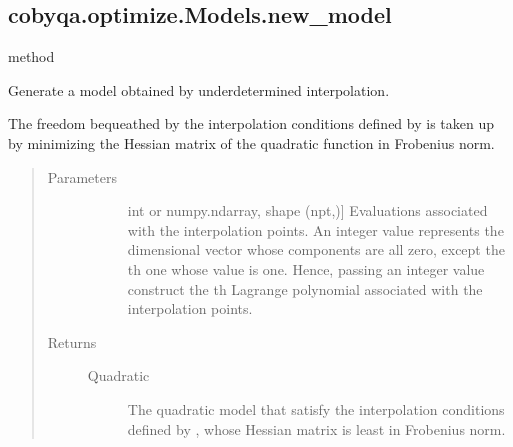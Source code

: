 \documentclass[letterpaper,10pt,english]{sphinxmanual}
\begin{document}
\begin{fulllineitems}
\begin{fulllineitems}
\begin{quote}
\begin{description}
\begin{description}
\end{description}

\end{description}\end{quote}

\end{fulllineitems}



\subsection{cobyqa.optimize.Models.new\_model}
\label{\detokenize{refs/generated/cobyqa.optimize.Models.new_model:cobyqa-optimize-models-new-model}}\label{\detokenize{refs/generated/cobyqa.optimize.Models.new_model::doc}}
\sphinxAtStartPar
method

\begin{fulllineitems}
\label{\detokenize{refs/generated/cobyqa.optimize.Models.new_model:cobyqa.optimize.Models.new_model}}
\sphinxAtStartPar
Generate a model obtained by underdetermined interpolation.

\sphinxAtStartPar
The freedom bequeathed by the interpolation conditions defined by 
is taken up by minimizing the Hessian matrix of the quadratic function
in Frobenius norm.
\begin{quote}\begin{description}
\item[{Parameters}] \leavevmode\begin{description}
\item[{}] \leavevmode{[}int or numpy.ndarray, shape (npt,){]}
\sphinxAtStartPar
Evaluations associated with the interpolation points. An integer
value represents the \sphinxhyphen{}dimensional vector whose components are
all zero, except the \sphinxhyphen{}th one whose value is one. Hence,
passing an integer value construct the \sphinxhyphen{}th Lagrange polynomial
associated with the interpolation points.

\end{description}

\item[{Returns}] \leavevmode\begin{description}
\item[{Quadratic}] \leavevmode
\sphinxAtStartPar
The quadratic model that satisfy the interpolation conditions
defined by , whose Hessian matrix is least in Frobenius norm.


\end{description}
\end{description}
\end{quote}
\end{fulllineitems}
\end{fulllineitems}
\end{document}
